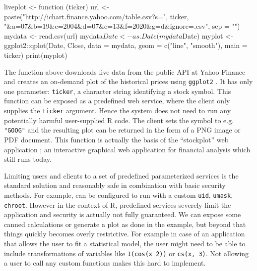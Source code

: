\documentclass{jss}
\newcommand{\R}{\textsf{R}\xspace}
\begin{document}
\begin{CodeChunk}
\begin{CodeInput} 
liveplot <- function (ticker) {
  url <- paste("http://ichart.finance.yahoo.com/table.csv?s=",
    ticker, "&a=07&b=19&c=2004&d=07&e=13&f=2020&g=d&ignore=.csv",
    sep = "")
  mydata <- read.csv(url)
  mydata$Date <- as.Date(mydata$Date)
  myplot <- ggplot2::qplot(Date, Close, data = mydata, geom = c("line",
    "smooth"), main = ticker)
  print(myplot)
}
\end{CodeInput}
\end{CodeChunk}

The function above downloads live data from the public API at Yahoo Finance and
creates an on-demand plot of the historical prices using \texttt{ggplot2}
\citep{ggplot2}. It has only one parameter: \texttt{ticker},
a character string identifying a stock symbol. This function can be exposed as a
predefined web service, where the client only supplies the \texttt{ticker}
argument. Hence the system does not need to run any potentially harmful
user-supplied \R code. The client sets the symbol to e.g.
\texttt{"GOOG"} and the resulting plot can be returned in the form of a
PNG image or PDF document. This function is actually the basis of the
``stockplot'' web application \citep{stockplot}; an interactive graphical web
application for financial analysis which still runs today.

Limiting users and clients to a set of predefined parameterized services is the 
standard solution and reasonably safe in combination with basic security methods.
For example,  can be configured to run with a custom \texttt{uid}, \texttt{umask}, \texttt{chroot}.
However in the context of \R, predefined services severely limit the application and security is actually not fully guaranteed.
We can expose some canned calculations or generate a plot as done in the example, but beyond that things quickly becomes overly restrictive. 
For example in case of an
application that allows the user to fit a statistical model, the user might
need to be able to include transformations of variables like \texttt{I(cos(x\^\ 2))} or \texttt{cs(x, 3)}. Not allowing a
user to call any custom functions makes this hard to implement.
\end{document}
